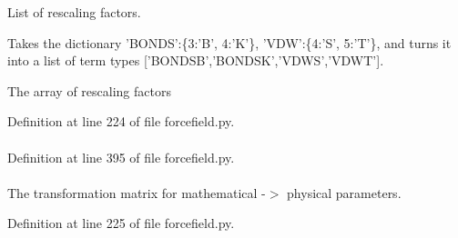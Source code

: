 \-List of rescaling factors. 

\-Takes the dictionary '\-B\-O\-N\-D\-S'\-:\{3\-:'\-B', 4\-:'\-K'\}, '\-V\-D\-W'\-:\{4\-:'\-S', 5\-:'\-T'\}, and turns it into a list of term types \mbox{[}'\-B\-O\-N\-D\-S\-B','\-B\-O\-N\-D\-S\-K','\-V\-D\-W\-S','\-V\-D\-W\-T'\mbox{]}.

\-The array of rescaling factors 

\-Definition at line 224 of file forcefield.\-py.

\hypertarget{classforcebalance_1_1forcefield_1_1FF_a785b2f406f5b8e094caa0de4d421cc83}{
\paragraph[{tinkerprm}]{}}\label{classforcebalance_1_1forcefield_1_1FF_a785b2f406f5b8e094caa0de4d421cc83}


\-Definition at line 395 of file forcefield.\-py.

\hypertarget{classforcebalance_1_1forcefield_1_1FF_a3ecc51355dbd97e0b1620007924fd2a3}{
\paragraph[{tm}]{}}\label{classforcebalance_1_1forcefield_1_1FF_a3ecc51355dbd97e0b1620007924fd2a3}


\-The transformation matrix for mathematical -\/$>$ physical parameters. 



\-Definition at line 225 of file forcefield.\-py.

\hypertarget{classforcebalance_1_1forcefield_1_1FF_a9c49407242f4e8da1c42530825c6dbda}{
\paragraph[{tm\-I}]{}}\label{classforcebalance_1_1forcefield_1_1FF_a9c49407242f4e8da1c42530825c6dbda}


